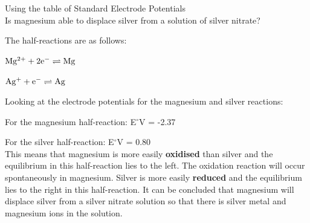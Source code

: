 \begin{wex}{Using the table of Standard Electrode Potentials\\}{
Is magnesium able to displace silver from a solution of silver nitrate?}
{ %


The half-reactions are as follows:

$\rm{Mg^{2+} + 2e^{-} \rightleftharpoons Mg}$

$\rm{Ag^{+} + e^{-} \rightleftharpoons Ag}$\\


Looking at the electrode potentials for the magnesium and silver reactions: 

For the magnesium half-reaction: E$^{\circ}$V = -2.37

For the silver half-reaction: E$^{\circ}$V = 0.80\\

This means that magnesium is more easily \textbf{oxidised} than silver and the equilibrium in this half-reaction lies to the left. The oxidation reaction will occur spontaneously in magnesium. Silver is more easily \textbf{reduced} and the equilibrium lies to the right in this half-reaction. It can be concluded that magnesium will displace silver from a silver nitrate solution so that there is silver metal and magnesium ions in the solution.
}
\end{wex}


